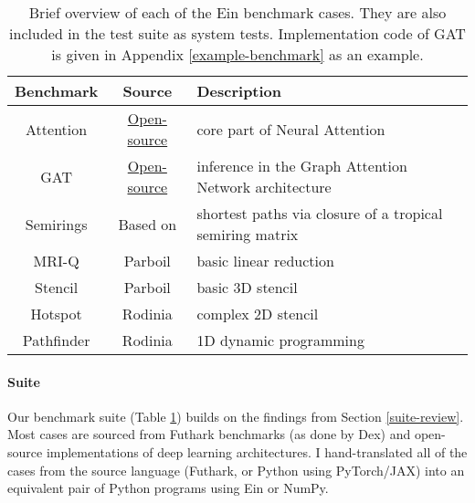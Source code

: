 \begin{table}[b]
    \centering
    \begin{tabular}{c|c|l}
       \textbf{Benchmark} & \textbf{Source} & \textbf{Description} \\ \hline
        Attention & \href{https://rockt.github.io/2018/04/30/einsum}{Open-source} & core part of Neural Attention \\
        GAT & \href{https://github.com/google-deepmind/clrs/blob/8697f51663bd77548f4b3108816c84d163883361/clrs/_src/processors.py#L130}{Open-source} & inference in the Graph Attention Network architecture \\
        Semirings & Based on \textcite{dolan2013fun} & shortest paths via closure of a tropical semiring matrix \\
        MRI-Q & Parboil & basic linear reduction \\
        Stencil & Parboil & basic 3D stencil \\
        Hotspot & Rodinia & complex 2D stencil \\
        Pathfinder & Rodinia & 1D dynamic programming 
    \end{tabular}
    \caption{Brief overview of each of the Ein benchmark cases. They are also included in the test suite as system tests. Implementation code of GAT is given in Appendix \ref{example-benchmark} as an example.}
    \label{tab:benchmarks}
\end{table}


\paragraph{Suite} Our benchmark suite (Table \ref{tab:benchmarks}) builds on the findings from Section \ref{suite-review}. 
Most cases are sourced from Futhark benchmarks \cite{The_Futhark_Hackers_futhark-benchmarks} (as done by Dex) and open-source implementations of deep learning architectures.
I hand-translated all of the cases from the source language (Futhark, or Python using PyTorch/JAX) into an equivalent pair of Python programs using Ein or NumPy.

